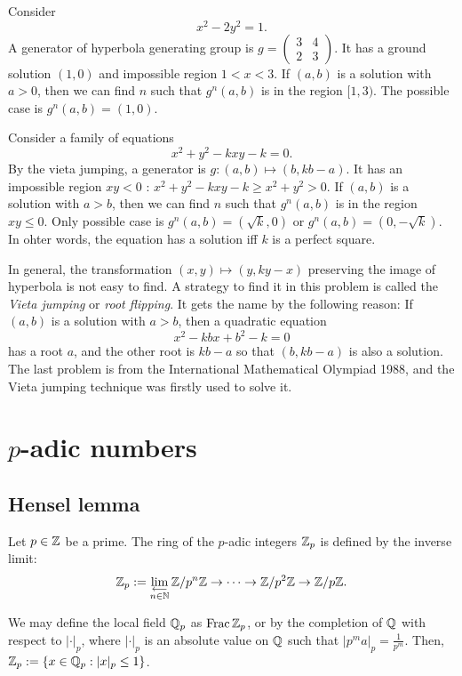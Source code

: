 \documentclass{../../large}
\begin{document}
\begin{ex}
Consider\[x^2-2y^2=1.\]
A generator of hyperbola generating group is $g=\begin{pmatrix}3&4\\2&3\end{pmatrix}$.
It has a ground solution $(1,0)$ and impossible region $1<x<3$.
If $(a,b)$ is a solution with $a>0$, then we can find $n$ such that $g^n(a,b)$ is in the region $[1,3)$.
The possible case is $g^n(a,b)=(1,0)$.
\end{ex}
\begin{ex}
Consider a family of equations\[x^2+y^2-kxy-k=0.\]
By the vieta jumping, a generator is $g:(a,b)\mapsto(b,kb-a)$.
It has an impossible region $xy<0$ : $x^2+y^2-kxy-k\ge x^2+y^2>0$.
If $(a,b)$ is a solution with $a>b$, then we can find $n$ such that $g^n(a,b)$ is in the region $xy\le0$.
Only possible case is $g^n(a,b)=(\sqrt k,0)$ or $g^n(a,b)=(0,-\sqrt k)$.
In ohter words, the equation has a solution iff $k$ is a perfect square.

In general, the transformation $(x,y)\mapsto(y,ky-x)$ preserving the image of hyperbola is not easy to find.
A strategy to find it in this problem is called the \emph{Vieta jumping} or \emph{root flipping}.
It gets the name by the following reason:
If $(a,b)$ is a solution with $a>b$, then a quadratic equation \[x^2-kbx+b^2-k=0\] has a root $a$, and the other root is $kb-a$ so that $(b,kb-a)$ is also a solution.
The last problem is from the International Mathematical Olympiad 1988, and the Vieta jumping technique was firstly used to solve it.
\end{ex}


\chapter{$p$-adic numbers}
\section{Hensel lemma}

Let $p\in\mathbb{Z}$ be a prime.
The ring of the $p$-adic integers $\mathbb{Z}_p$ is defined by the inverse limit:
\[
\mathbb{Z}_p:=\lim\limits_{\substack{\longleftarrow\\n\in\mathbb{N}}}\mathbb{Z}/p^n\mathbb{Z}\to\cdots\to\mathbb{Z}/p^2\mathbb{Z}\to\mathbb{Z}/p\mathbb{Z}.
\]

We may define the local field $\mathbb{Q}_p$ as $\operatorname{Frac}\mathbb{Z}_p$, or by the completion of $\mathbb{Q}$ with respect to $|\cdot|_p$, where $|\cdot|_p$ is an absolute value on $\mathbb{Q}$ such that $|p^ma|_p=\frac1{p^m}$.
Then,
$\mathbb{Z}_p:=\{x\in\mathbb{Q}_p:|x|_p\le1\}$.
\end{document}
